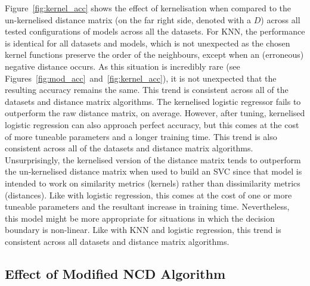 \documentclass[conference]{IEEEtran}
\begin{document}
Figure~\ref{fig:kernel_acc} shows the effect of kernelisation when compared to the un-kernelised distance matrix (on the far right side, denoted with a $D$) across all tested configurations of models across all the datasets. 
For KNN, the performance is identical for all datasets and models, which is not unexpected as the chosen kernel functions preserve the order of the neighbours, except when an (erroneous) negative distance occurs. 
As this situation is incredibly rare (see Figures~\ref{fig:mod_acc}~and~\ref{fig:kernel_acc}), it is not unexpected that the resulting accuracy remains the same. 
This trend is consistent across all of the datasets and distance matrix algorithms.
The kernelised logistic regressor fails to outperform the raw distance matrix, on average. 
However, after tuning, kernelised logistic regression can also approach perfect accuracy, but this comes at the cost of more tuneable parameters and a longer training time. 
This trend is also consistent across all of the datasets and distance matrix algorithms.
Unsurprisingly, the kernelised version of the distance matrix tends to outperform the un-kernelised distance matrix when used to build an SVC since that model is intended to work on similarity metrics (kernels) rather than dissimilarity metrics (distances). 
Like with logistic regression, this comes at the cost of one or more tuneable parameters and the resultant increase in training time. 
Nevertheless, this model might be more appropriate for situations in which the decision boundary is non-linear. 
Like with KNN and logistic regression, this trend is consistent across all datasets and distance matrix algorithms.


\subsection{Effect of Modified NCD Algorithm}
\end{document}
